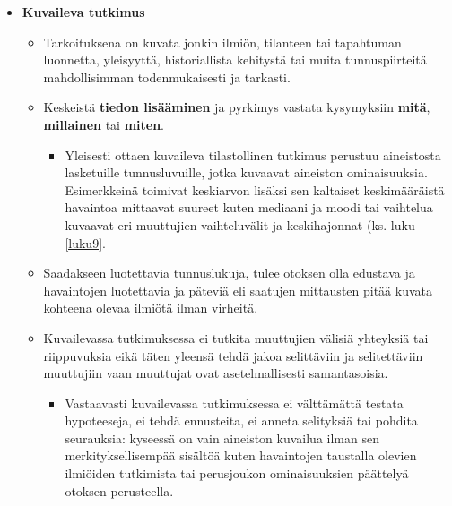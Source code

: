 \documentclass[
]{book}
\providecommand{\tightlist}{%
  \setlength{\itemsep}{0pt}\setlength{\parskip}{0pt}}
\begin{document}
\begin{itemize}
\tightlist
\item
  \textbf{Kuvaileva tutkimus}

  \begin{itemize}
  \tightlist
  \item
    Tarkoituksena on kuvata jonkin ilmiön, tilanteen tai tapahtuman luonnetta, yleisyyttä, historiallista kehitystä tai muita tunnuspiirteitä mahdollisimman todenmukaisesti ja tarkasti.
  \item
    Keskeistä \textbf{tiedon lisääminen} ja pyrkimys vastata kysymyksiin \textbf{mitä}, \textbf{millainen} tai \textbf{miten}.

    \begin{itemize}
    \tightlist
    \item
      Yleisesti ottaen kuvaileva tilastollinen tutkimus perustuu aineistosta lasketuille tunnusluvuille, jotka kuvaavat aineiston ominaisuuksia. Esimerkkeinä toimivat keskiarvon lisäksi sen kaltaiset keskimääräistä havaintoa mittaavat suureet kuten mediaani ja moodi tai vaihtelua kuvaavat eri muuttujien vaihteluvälit ja keskihajonnat (ks. luku \ref{luku9}.
    \end{itemize}
  \item
    Saadakseen luotettavia tunnuslukuja, tulee otoksen olla edustava ja havaintojen luotettavia ja päteviä eli saatujen mittausten pitää kuvata kohteena olevaa ilmiötä ilman virheitä.
  \item
    Kuvailevassa tutkimuksessa ei tutkita muuttujien välisiä yhteyksiä tai riippuvuksia eikä täten yleensä tehdä jakoa selittäviin ja selitettäviin muuttujiin vaan muuttujat ovat asetelmallisesti samantasoisia.

    \begin{itemize}
    \tightlist
    \item
      Vastaavasti kuvailevassa tutkimuksessa ei välttämättä testata hypoteeseja, ei tehdä ennusteita, ei anneta selityksiä tai pohdita seurauksia: kyseessä on vain aineiston kuvailua ilman sen merkityksellisempää sisältöä kuten havaintojen taustalla olevien ilmiöiden tutkimista tai perusjoukon ominaisuuksien päättelyä otoksen perusteella.
    \end{itemize}
  \end{itemize}
\end{itemize}

\hfill\break
\end{document}
